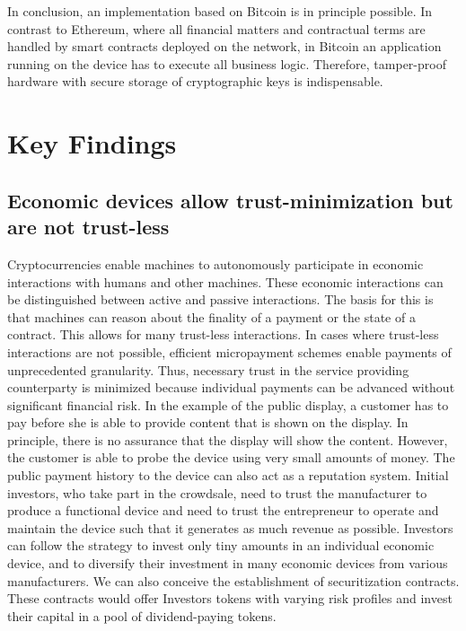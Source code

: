 In conclusion, an implementation based on Bitcoin is in principle possible. In contrast to Ethereum, where all financial matters and contractual terms are handled by smart contracts deployed on the network, in Bitcoin an application running on the device has to execute all business logic. Therefore, tamper-proof hardware with secure storage of cryptographic keys is indispensable.


\section{Key Findings}

\subsection{Economic devices allow trust-minimization but are not trust-less}
Cryptocurrencies enable machines to autonomously participate in economic interactions with humans and other machines. These economic interactions can be distinguished between active and passive interactions. The basis for this is that machines can reason about the finality of a payment or the state of a contract. This allows for many trust-less interactions. In cases where trust-less interactions are not possible, efficient micropayment schemes enable payments of unprecedented granularity. Thus, necessary trust in the service providing counterparty is minimized because individual payments can be advanced without significant financial risk. In the example of the public display, a customer has to pay before she is able to provide content that is shown on the display. In principle, there is no assurance that the display will show the content. However, the customer is able to probe the device using very small amounts of money. The public payment history to the device can also act as a reputation system. Initial investors, who take part in the crowdsale, need to trust the manufacturer to produce a functional device and need to trust the entrepreneur to operate and maintain the device such that it generates as much revenue as possible. Investors can follow the strategy to invest only tiny amounts in an individual economic device, and to diversify their investment in many economic devices from various manufacturers. We can also conceive the establishment of securitization contracts. These contracts would offer Investors tokens with varying risk profiles and invest their capital in a pool of dividend-paying tokens. 

